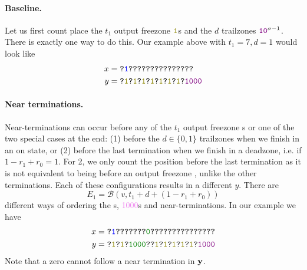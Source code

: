 \paragraph{Baseline.}

Let us first count place the $t_1$  output freezone $\olive{1}$s  and the $d$ trailzones $\texttt{\textcolor{violet}{10}}^{\sigma-1}$. There is exactly one way to do this. Our example above with $t_1=7,d=1$ would look like
\begin{align*}
  x&=\texttt{?\blue{1}???????????????}\\
  y&=\texttt{?\olive{1}?\olive{1}?\olive{1}?\olive{1}?\olive{1}?\olive{1}?\olive{1}?\textcolor{violet}{1000}}
\end{align*}

\paragraph{Near terminations.} Near-terminations can occur before any of the $t_1$ output freezone \texttt{}s or one of the two special cases at the end: (1) before the $d \in \{0,1\}$ trailzones when we finish in an on state, or (2) before the last termination when we finish in a deadzone, i.e. if $1-r_1+r_0=1$. For 2, we only count the position before the last termination as it is not equivalent to being before an output freezone , unlike the other terminations. Each of these configurations results in a different $y$. There are
$$
E_1=\mathcal{B}(v,t_1+d+(1-r_1+r_0))
$$
different ways of ordering the s, \textcolor{violet}{1000}s and near-terminations. In our example we have
\begin{align*}
  x&=\texttt{?\blue{1}???????\green{0}???????????????}\\
  y&=\texttt{?\olive{1}?\olive{1}?\green{1000}??\olive{1}?\olive{1}?\olive{1}?\olive{1}?\olive{1}?\textcolor{violet}{1000}}
\end{align*}
Note that a zero cannot follow a near termination in $\mathbf{y}$.

